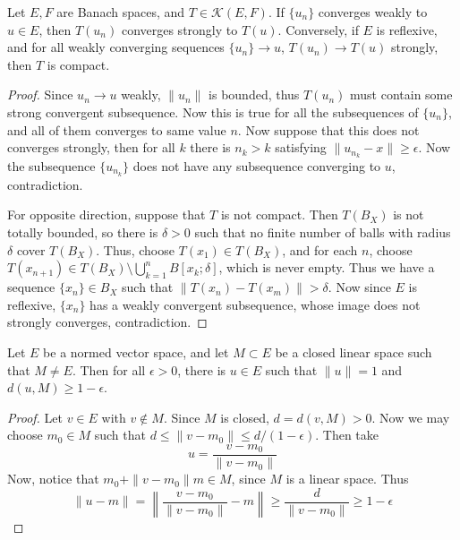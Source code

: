 \begin{prop} Let $E,F$ are Banach spaces, and $T\in \mathcal{K}(E,F)$. If $\{u_n\}$ converges weakly to $u\in E$, then $T(u_n)$ converges strongly to $T(u)$. Conversely, if $E$ is reflexive, and for all weakly converging sequences $\{u_n\}\rightarrow u$, $T(u_n)\rightarrow T(u)$ strongly, then $T$ is compact.
\end{prop}
\begin{proof} Since $u_n\rightarrow u$ weakly, $\|u_n\|$ is bounded, thus $T(u_n)$ must contain some strong convergent subsequence. Now this is true for all the subsequences of $\{u_n\}$, and all of them converges to same value $n$. Now suppose that this does not converges strongly, then for all $k$ there is $n_k>k$ satisfying $\|u_{n_k}-x\|\geq \epsilon$. Now the subsequence $\{u_{n_k}\}$ does not have any subsequence converging to $u$, contradiction.

For opposite direction, suppose that $T$ is not compact. Then $T(B_X)$ is not totally bounded, so there is $\delta>0$ such that no finite number of balls with radius $\delta$ cover $T(B_X)$. Thus, choose $T(x_1)\in T(B_X)$, and for each $n$, choose $T(x_{n+1})\in T(B_X)\setminus \bigcup_{k=1}^n B[x_k;\delta]$, which is never empty. Thus we have a sequence $\{x_n\}\in B_X$ such that $\|T(x_n)-T(x_m)\|>\delta$. Now since $E$ is reflexive, $\{x_n\}$ has a weakly convergent subsequence, whose image does not strongly converges, contradiction.
\end{proof}

\begin{lemma} Let $E$ be a normed vector space, and let $M\subset E$ be a closed linear space such that $M\neq E$. Then for all $\epsilon>0$, there is $u\in E$ such that $\|u\|=1$ and $d(u,M)\geq 1-\epsilon$.
\end{lemma}
\begin{proof}
Let $v\in E$ with $v\not\in M$. Since $M$ is closed, $d=d(v,M)>0$. Now we may choose $m_0\in M$ such that $d\leq \|v-m_0\|\leq d/(1-\epsilon)$. Then take
\begin{equation}
    u=\frac{v-m_0}{\|v-m_0\|}
\end{equation}
Now, notice that $m_0+\|v-m_0\|m\in M$, since $M$ is a linear space. Thus
\begin{equation}
    \|u-m\|=\left\|\frac{v-m_0}{\|v-m_0\|}-m\right\|\geq \frac{d}{\|v-m_0\|}\geq 1-\epsilon
\end{equation}
\end{proof}

